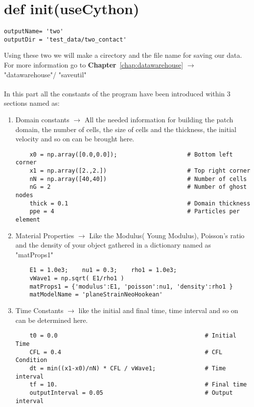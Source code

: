 \documentclass[11pt,fleqn]{book} %
\begin{document}
\section{def init(useCython)}

\begin{lstlisting}
outputName= 'two'
outputDir = 'test_data/two_contact'
\end{lstlisting}

Using these two we will make a cirectory and the file name for saving our data. For more information go to \textbf{Chapter}~\ref{chap:datawarehouse} $\rightarrow$ "datawarehouse"/ "saveutil"\\ \\

In this part all the constants of the program have been introduced within 3 sections named as:

\begin{enumerate}

\item Domain constants $\rightarrow$ All the needed information for building the patch domain, the number of cells, the size of cells and the thickness, the initial velocity and so on can be brought here.

\begin{lstlisting}
    x0 = np.array([0.0,0.0]);                    # Bottom left corner
    x1 = np.array([2.,2.])                       # Top right corner
    nN = np.array([40,40])                       # Number of cells
    nG = 2                                       # Number of ghost nodes
    thick = 0.1                                  # Domain thickness
    ppe = 4                                      # Particles per element
\end{lstlisting}


\item Material Properties $\rightarrow$ Like the Modulus( Young Modulus), Poisson's ratio and the density of your object gathered in a dictionary named as "matProps1"
\begin{lstlisting}
    E1 = 1.0e3;    nu1 = 0.3;    rho1 = 1.0e3;    
    vWave1 = np.sqrt( E1/rho1 )
    matProps1 = {'modulus':E1, 'poisson':nu1, 'density':rho1 }
    matModelName = 'planeStrainNeoHookean'
\end{lstlisting}

\item Time Constants $\rightarrow$ like the initial and final time, time interval and so on can be determined here.
\begin{lstlisting}
    t0 = 0.0                                          # Initial Time
    CFL = 0.4                                         # CFL Condition
    dt = min((x1-x0)/nN) * CFL / vWave1;              # Time interval
    tf = 10.                                          # Final time
    outputInterval = 0.05                             # Output interval
\end{lstlisting}

\end{enumerate}
\end{document}
